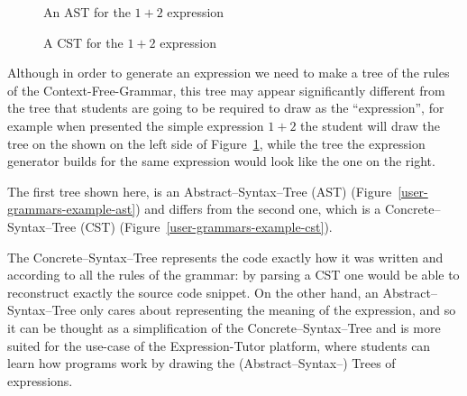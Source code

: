 \documentclass[]{usiinfbachelorproject}
\begin{document}
\begin{figure}[ht]
\centering
\begin{minipage}{0.45\textwidth}
\centering
{}
\caption{An AST for the $ 1 + 2 $ expression
}\label{user-grammars-example-ast}
\end{minipage}
\begin{minipage}{0.45\textwidth}
\centering
{}
\caption{A CST for the $ 1 + 2 $ expression
}\label{user-grammars-example-cst}
\end{minipage}
\caption{
}\label{user-grammars-example}
\end{figure}

Although in order to generate an expression we need to make a tree of
the rules of the Context-Free-Grammar, this tree may appear significantly
different from the tree that students are going to be required to draw as the
``expression'', for example when presented the simple expression $ 1 + 2 $
the student will draw the tree on the shown on the left side of
Figure~\ref{user-grammars-example}, while the tree the expression generator
builds for the same expression would look like the one on the right.

The first tree shown here, is an Abstract–Syntax–Tree (AST)
(Figure~\ref{user-grammars-example-ast}) and differs from the second one, which
is a Concrete–Syntax–Tree (CST) (Figure~\ref{user-grammars-example-cst}).

The Concrete–Syntax–Tree represents the code exactly how it was written and
according to all the rules of the grammar: by parsing a CST one would be able
to reconstruct exactly the source code snippet. On the other hand, an
Abstract–Syntax–Tree only cares about representing the meaning of the
expression, and so it can be thought as a simplification of the
Concrete–Syntax–Tree and is more suited for the use-case of the Expression-Tutor
platform, where students can learn how programs work by drawing the
(Abstract–Syntax–) Trees of expressions.
\end{document}
